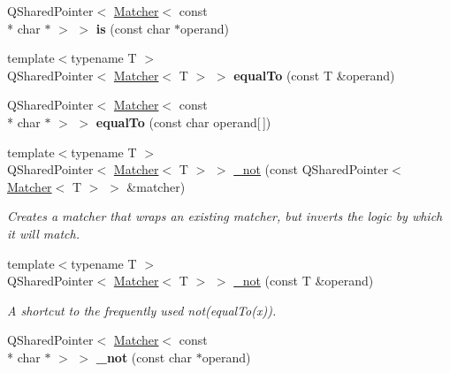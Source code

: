 \begin{DoxyCompactItemize}
\item 
\hypertarget{namespace_hamcrest_qt_aeee2510fdb711c6f7185b68e269ff2a9}{Q\-Shared\-Pointer$<$ \hyperlink{class_hamcrest_qt_1_1_matcher}{Matcher}$<$ const \\*
char $\ast$ $>$ $>$ {\bfseries is} (const char $\ast$operand)}\label{namespace_hamcrest_qt_aeee2510fdb711c6f7185b68e269ff2a9}

\item 
\hypertarget{namespace_hamcrest_qt_a117dd95db4e9739b9131ba7e3fa943c3}{{\footnotesize template$<$typename T $>$ }\\Q\-Shared\-Pointer$<$ \hyperlink{class_hamcrest_qt_1_1_matcher}{Matcher}$<$ T $>$ $>$ {\bfseries equal\-To} (const T \&operand)}\label{namespace_hamcrest_qt_a117dd95db4e9739b9131ba7e3fa943c3}

\item 
\hypertarget{namespace_hamcrest_qt_a69fe6ca6e07236c8071b760c8e1508a3}{Q\-Shared\-Pointer$<$ \hyperlink{class_hamcrest_qt_1_1_matcher}{Matcher}$<$ const \\*
char $\ast$ $>$ $>$ {\bfseries equal\-To} (const char operand\mbox{[}$\,$\mbox{]})}\label{namespace_hamcrest_qt_a69fe6ca6e07236c8071b760c8e1508a3}

\item 
{\footnotesize template$<$typename T $>$ }\\Q\-Shared\-Pointer$<$ \hyperlink{class_hamcrest_qt_1_1_matcher}{Matcher}$<$ T $>$ $>$ \hyperlink{namespace_hamcrest_qt_a1adc24012e56d9cd44b402873a3ffc03}{\-\_\-not} (const Q\-Shared\-Pointer$<$ \hyperlink{class_hamcrest_qt_1_1_matcher}{Matcher}$<$ T $>$ $>$ \&matcher)
\begin{DoxyCompactList}\small\item\em Creates a matcher that wraps an existing matcher, but inverts the logic by which it will match. \end{DoxyCompactList}\item 
{\footnotesize template$<$typename T $>$ }\\Q\-Shared\-Pointer$<$ \hyperlink{class_hamcrest_qt_1_1_matcher}{Matcher}$<$ T $>$ $>$ \hyperlink{namespace_hamcrest_qt_abfd16a389cc4dbec5004ba9c9d059660}{\-\_\-not} (const T \&operand)
\begin{DoxyCompactList}\small\item\em A shortcut to the frequently used {\ttfamily not(equal\-To(x))}. \end{DoxyCompactList}\item 
\hypertarget{namespace_hamcrest_qt_ae671e6aecabf951d073f2e0e4c0fb2b8}{Q\-Shared\-Pointer$<$ \hyperlink{class_hamcrest_qt_1_1_matcher}{Matcher}$<$ const \\*
char $\ast$ $>$ $>$ {\bfseries \-\_\-not} (const char $\ast$operand)}\label{namespace_hamcrest_qt_ae671e6aecabf951d073f2e0e4c0fb2b8}


\end{DoxyCompactItemize}
